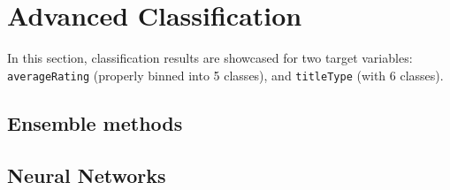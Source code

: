 \section{Advanced Classification}

In this section, classification results are showcased for two
target variables: \texttt{averageRating} (properly binned into
5 classes), and \texttt{titleType} (with 6 classes).


\subsection{Ensemble methods}



\subsection{Neural Networks}
